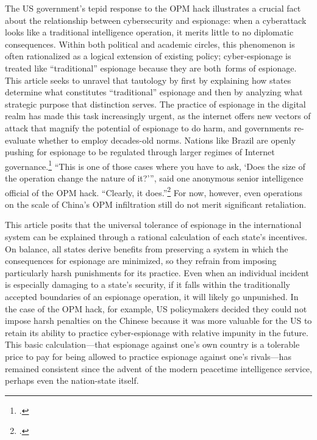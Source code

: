 \documentclass[14pt]{extarticle}
\begin{document}
The US government's tepid response to the OPM hack illustrates a crucial fact about the relationship between cybersecurity and espionage: when a cyberattack looks like a traditional intelligence operation, it merits little to no diplomatic consequences. Within both political and academic circles, this phenomenon is often rationalized as a logical extension of existing policy; cyber-espionage is treated like \enquote{traditional} espionage because they are both forms of espionage. This article seeks to unravel that tautology by first by explaining how states determine what constitutes \enquote{traditional} espionage and then by analyzing what strategic purpose that distinction serves. The practice of espionage in the digital realm has made this task increasingly urgent, as the internet offers new vectors of attack that magnify the potential of espionage to do harm, and governments re-evaluate whether to employ decades-old norms. Nations like Brazil are openly pushing for espionage to be regulated through larger regimes of Internet governance.\footcite[p.~464]{abdenur_triggering_2015} ``This is one of those cases where you have to ask, `Does the size of the operation change the nature of it?'\thinspace'', said one anonymous senior intelligence official of the OPM hack. \enquote{Clearly, it does.}\footcite{sanger_u.s._2015} For now, however, even operations on the scale of China's OPM infiltration still do not merit significant retaliation.



This article posits that the universal tolerance of espionage in the international system can be explained through a rational calculation of each state's incentives. On balance, all states derive benefits from preserving a system in which the consequences for espionage are minimized, so they refrain from imposing particularly harsh punishments for its practice. Even when an individual incident is especially damaging to a state's security, if it falls within the traditionally accepted boundaries of an espionage operation, it will likely go unpunished. In the case of the OPM hack, for example, US policymakers decided they could not impose harsh penalties on the Chinese because it was more valuable for the US to retain its ability to practice cyber-espionage with relative impunity in the future. This basic calculation---that espionage against one's own country is a tolerable price to pay for being allowed to practice espionage against one's rivals---has remained consistent since the advent of the modern peacetime intelligence service, perhaps even the nation-state itself.
\end{document}
